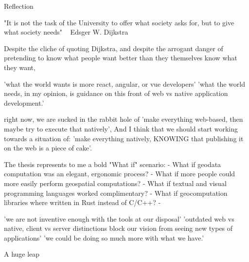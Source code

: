 \begin{note}
  
Reflection

"It is not the task of the University to offer what society asks for, but to give what society needs" ~ Edsger W. Dijkstra

Despite the cliche of quoting Dijkstra, and despite the arrogant danger of pretending to know what people want better than they themselves know what they want, 


'what the world wants is more react, angular, or vue developers'
'what the world needs, in my opinion, is guidance on this front of web vs native application development.'

right now, we are sucked in the rabbit hole of 'make everything web-based, then maybe try to execute that natively',
And I think that we should start working towards a situation of: 'make everything natively, KNOWING that publishing it on the web is a piece of cake'.



The thesis represents to me a bold "What if" scenario: 
- What if geodata computation was an elegant, ergonomic process?
- What if more people could more easily perform geospatial computations?
- What if textual and visual programming languages worked complimentary?    
- What if geocomputation libraries where written in Rust instead of C/C++?
- 

'we are not inventive enough with the tools at our disposal'
'outdated web vs native, client vs server distinctions block our vision from seeing new types of applications'
'we could be doing so much more with what we have.'


A huge leap 

\end{note}

